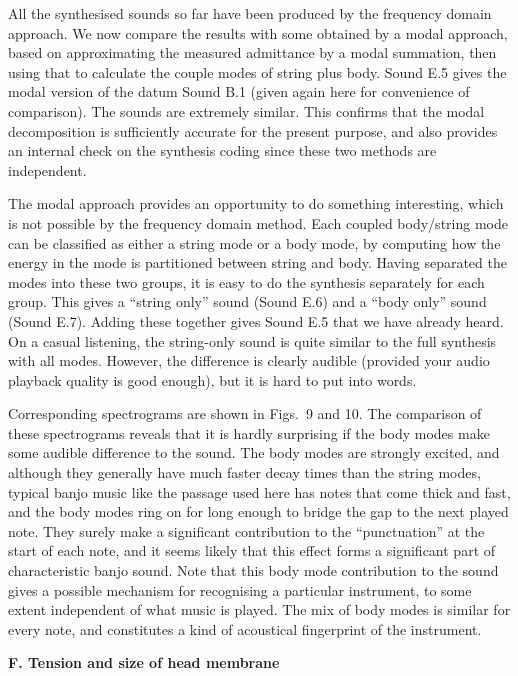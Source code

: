   All the synthesised sounds so far have been produced by the frequency domain 
  approach. We now compare the results with some obtained by a modal approach, 
  based on approximating the measured admittance by a modal summation, then 
  using that to calculate the couple modes of string plus body. Sound E.5 gives 
  the modal version of the datum Sound B.1 (given again here for convenience of 
  comparison). The sounds are extremely similar. This confirms that the modal 
  decomposition is sufficiently accurate for the present purpose, and also 
  provides an internal check on the synthesis coding since these two methods 
  are independent. 

  The modal approach provides an opportunity to do something interesting, which 
  is not possible by the frequency domain method. Each coupled body/string mode 
  can be classified as either a string mode or a body mode, by computing how 
  the energy in the mode is partitioned between string and body. Having 
  separated the modes into these two groups, it is easy to do the synthesis 
  separately for each group. This gives a ``string only'' sound (Sound E.6) and 
  a ``body only'' sound (Sound E.7). Adding these together gives Sound E.5 that 
  we have already heard. On a casual listening, the string-only sound is quite 
  similar to the full synthesis with all modes. However, the difference is 
  clearly audible (provided your audio playback quality is good enough), but it 
  is hard to put into words. 

  Corresponding spectrograms are shown in Figs.\ 9 and 10. The comparison of 
  these spectrograms reveals that it is hardly surprising if the body modes 
  make some audible difference to the sound. The body modes are strongly 
  excited, and although they generally have much faster decay times than the 
  string modes, typical banjo music like the passage used here has notes that 
  come thick and fast, and the body modes ring on for long enough to bridge the 
  gap to the next played note. They surely make a significant contribution to 
  the ``punctuation'' at the start of each note, and it seems likely that this 
  effect forms a significant part of characteristic banjo sound. Note that this 
  body mode contribution to the sound gives a possible mechanism for 
  recognising a particular instrument, to some extent independent of what music 
  is played. The mix of body modes is similar for every note, and constitutes a 
  kind of acoustical fingerprint of the instrument. 

  \textbf{F. Tension and size of head membrane} 


